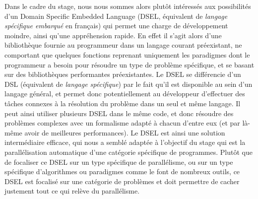 Dans le cadre du stage, nous nous sommes alors plutôt intéressés aux possibilités d'un Domain Specific Embedded Language (DSEL, équivalent de \emph{langage spécifique embarqué} en français) qui permet une charge de développement moindre, ainsi qu'une appréhension rapide. En effet il s'agit alors d'une bibliothèque fournie au programmeur dans un langage courant préexistant, ne comportant que quelques fonctions reprenant uniquement les paradigmes dont le programmeur a besoin pour résoudre un type de problème spécifique, et se basant sur des bibliothèques performantes préexistantes. Le DSEL se différencie d'un DSL (équivalent de \emph{langage spécifique}) par le fait qu'il est disponible au sein d'un langage général, et permet donc potentiellement au développeur d'effectuer des tâches connexes à la résolution du problème dans un seul et même langage. Il peut ainsi utiliser plusieurs DSEL dans le même code, et donc résoudre des problèmes complexes avec un formalisme adapté à chacun d'entre eux (et par là-même avoir de meilleures performances). Le DSEL est ainsi une solution intermédiaire efficace, qui nous a semblé adaptée à l'objectif du stage qui est la parallélisation automatique d'une catégorie spécifique de programmes. Plutôt que de focaliser ce DSEL sur un type spécifique de parallélisme, ou sur un type spécifique d'algorithmes ou paradigmes comme le font de nombreux outils, ce DSEL est focalisé sur une catégorie de problèmes et doit permettre de cacher justement tout ce qui relève du parallélisme.



